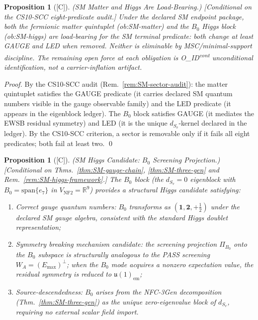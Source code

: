 \documentclass[12pt,oneside]{amsbook}
\theoremstyle{plain}
\newtheorem{proposition}[theorem]{Proposition}
\theoremstyle{definition}
\theoremstyle{remark}
\newcommand{\status}[1]{\textup{[#1]}}
\begin{document}
\begin{proposition}[\status{C}]\label{prop:SM-sector-load-bearing}
\textup{(SM Matter and Higgs Are Load-Bearing.)}
\textup{[Conditional on the CS10-SCC eight-predicate audit.]}
Under the declared SM endpoint package, both the fermionic matter
quintuplet (ob:SM-matter) and the $B_0$ Higgs block (ob:SM-higgs)
are load-bearing for the SM terminal predicate: both change at
least GAUGE and LED when removed. Neither is eliminable by
MSC/minimal-support discipline. The remaining open force at each
obligation is O\_ID\textsuperscript{cont} unconditional identification,
not a carrier-inflation artifact.
\end{proposition}

\begin{proof}
By the CS10-SCC audit (Rem.~\ref{rem:SM-sector-audit}):
the matter quintuplet satisfies the GAUGE predicate (it carries
declared SM quantum numbers visible in the gauge observable family)
and the LED predicate (it appears in the eigenblock ledger).
The $B_0$ block satisfies GAUGE (it mediates the EWSB residual
symmetry) and LED (it is the unique $d_{S_v}$-kernel declared in
the ledger). By the CS10-SCC criterion, a sector is removable
only if it fails all eight predicates; both fail at least two.
\qed
\end{proof}





\begin{proposition}[\status{C}]\label{prop:rh-SM-higgs-candidate}
\textup{(SM Higgs Candidate: $B_0$ Screening Projection.)}
\textup{[Conditional on Thms.~\ref{thm:SM-gauge-chain},
\ref{thm:SM-three-gen} and Rem.~\ref{rem:SM-higgs-framework}.]}
The $B_0$ block (the $d_{S_v} = 0$ eigenblock with
$B_0 = \mathrm{span}\{e_7\}$ in $V_{\mathrm{NF2}} = \mathbb{R}^9$)
provides a structural Higgs candidate satisfying:
\begin{enumerate}[label=\textup{(\arabic*)}]
 \item \emph{Correct gauge quantum numbers}: $B_0$ transforms as
 $(\mathbf{1}, \mathbf{2}, +\tfrac{1}{2})$ under the declared SM gauge
 algebra, consistent with the standard Higgs doublet representation;
 \item \emph{Symmetry breaking mechanism candidate}: the screening
 projection $\Pi_{B_0}$ onto the $B_0$ subspace is structurally
 analogous to the PASS screening $W_A = (E_{\max})^\perp$; when
 the $B_0$ mode acquires a nonzero expectation value, the residual
 symmetry is reduced to $\mathfrak{u}(1)_{\mathrm{em}}$;
 \item \emph{Source-descendedness}: $B_0$ arises from the NFC-3Gen
 decomposition (Thm.~\ref{thm:SM-three-gen}) as the unique
 zero-eigenvalue block of $d_{S_v}$, requiring no external scalar
 field import.
\end{enumerate}
\end{proposition}
\end{document}
